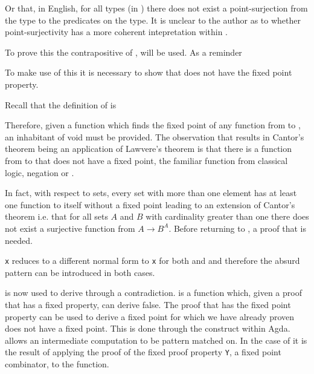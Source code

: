 
Or that, in English, for all types (in ) there does not exist
a point-surjection from the type to the predicates on the type. It is unclear
to the author as to whether point-surjectivity has a more coherent intepretation
within .

To prove this  the contrapositive of
,  will be used. As a reminder


To make use of this it is necessary to show that  does not
have the fixed point property.


Recall that the definition of  is

Therefore, given a function which finds the fixed point of any function from
 to , an inhabitant of void must be
provided. The observation that results in Cantor's theorem being an application
of Lawvere's theorem is that there is a function from  to
 that does not have a fixed point, the familiar function from
classical logic, negation or .


In fact, with respect to sets, every set with more than one element has at least
one function to itself without a fixed point leading to an extension of Cantor's
theorem i.e. that for all sets $A$ and $B$ with cardinality greater than one
there does not exist a surjective function from $A \rightarrow B^A$. Before
returning to , a proof that  is
needed.


 \verb|x| reduces to a different normal form to \verb|x| for
both  and  and therefore the absurd pattern can
be introduced in both cases.


 is now used to derive 
through a contradiction.   is a function
which, given a proof that  has a fixed property, can derive
false. The proof that  has the fixed point property can be
used to derive a fixed point for  which we have already proven
does not have a fixed point. This is done through the 
construct within Agda.  allows an intermediate computation to
be pattern matched on. In the case of  it is the
result of applying the proof of the fixed proof property \verb|Y|, a fixed point
combinator, to the  function.

